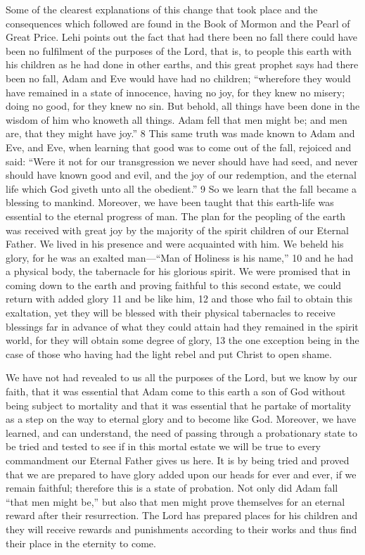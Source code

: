 Some of the clearest explanations of this change that took place and the consequences which
followed are found in the Book of Mormon and the Pearl of Great Price. Lehi points out the
fact that had there been no fall there could have been no fulfilment of the purposes of the
Lord, that is, to people this earth with his children as he had done in other earths, and this
great prophet says had there been no fall, Adam and Eve would have had no children;
``wherefore they would have remained in a state of innocence, having no joy, for they knew
no misery; doing no good, for they knew no sin. But behold, all things have been done in the
wisdom of him who knoweth all things. Adam fell that men might be; and men are, that they
might have joy.'' 8 This same truth was made known to Adam and Eve, and Eve, when
learning that good was to come out of the fall, rejoiced and said: ``Were it not for our
transgression we never should have had seed, and never should have known good and evil,
and the joy of our redemption, and the eternal life which God giveth unto all the obedient.'' 9
So we learn that the fall became a blessing to mankind. Moreover, we have been taught that
this earth-life was essential to the eternal progress of man. The plan for the peopling of the
earth was received with great joy by the majority of the spirit children of our Eternal Father.
We lived in his presence and were acquainted with him. We beheld his glory, for he was an
exalted man—``Man of Holiness is his name,'' 10 and he had a physical body, the tabernacle
for his glorious spirit. We were promised that in coming down to the earth and proving
faithful to this second estate, we could return with added glory 11 and be like him, 12 and
those who fail to obtain this exaltation, yet they will be blessed with their physical
tabernacles to receive blessings far in advance of what they could attain had they remained in
the spirit world, for they will obtain some degree of glory, 13 the one exception being in the
case of those who having had the light rebel and put Christ to open shame.

We have not had revealed to us all the purposes of the Lord, but we know by our faith, that it
was essential that Adam come to this earth a son of God without being subject to mortality
and that it was essential that he partake of mortality as a step on the way to eternal glory and
to become like God. Moreover, we have learned, and can understand, the need of passing
through a probationary state to be tried and tested to see if in this mortal estate we will be
true to every commandment our Eternal Father gives us here. It is by being tried and proved
that we are prepared to have glory added upon our heads for ever and ever, if we remain
faithful; therefore this is a state of probation. Not only did Adam fall ``that men might be,''
but also that men might prove themselves for an eternal reward after their resurrection. The
Lord has prepared places for his children and they will receive rewards and punishments
according to their works and thus find their place in the eternity to come.

